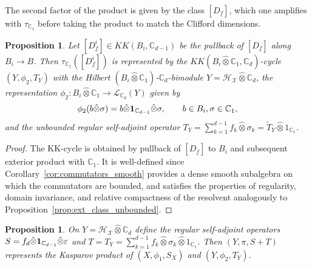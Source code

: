 \documentclass[12pt]{amsart}
\newtheorem{proposition}[theorem]{Proposition}
\newcommand{\CM}{{\mathbb C}}
\newcommand{\Ll}{{\mathcal L}}
\newcommand{\Hh}{{\mathcal H}}
\newcommand{\Xx}{{\mathcal X}}
\newcommand{\one}{{\bf 1}}
\newcommand{\ep}{\varepsilon}
\begin{document}
The second factor of the product is given by the class $[D_{\underline{f}}]$, which one amplifies with $\tau_{\CM_1}$ before taking the product to match the Clifford dimensions. 
\begin{proposition}
Let $[D_{\underline{f}}^i]\in KK(B_i, \CM_{d-1})$ be the pullback of $[D_{\underline{f}}]$ along $B_i\to B$. Then $\tau_{\CM_1}([D^i_{\underline{f}}])$ is represented by the $KK(B_i\hat{\otimes}\CM_1, \CM_d)$-cycle $(Y, \phi_2, T_Y)$ with  the Hilbert $(B_i\hat{\otimes}\CM_1)$-$\CM_d$-bimodule $Y= \Hh_\Xx \hat{\otimes} \CM_{d}$, the representation $\phi_2 \colon B_i \hat{\otimes} \CM_1 \to \Ll_{\CM_d}(Y)$ given by
    $$\phi_2(b\hat{\otimes} \sigma) = b \hat{\otimes}  \one_{\CM_{d-1}} \hat{\otimes} \sigma, \qquad b\in B_i, \sigma\in \CM_1,$$
and the unbounded regular self-adjoint operator $T_Y  = \sum_{k=1}^{d-1} {f_k} \hat{\otimes} \sigma_k= \tilde{T}_Y\hat{\otimes} 1_{\CM_1}$. 
\end{proposition}
\begin{proof}
The KK-cycle is obtained by pullback of $[D_{\underline{f}}]$ to $B_i$ and subsequent exterior product with $\CM_1$. It is well-defined since Corollary~\ref{cor:commutators_smooth} provides a dense smooth subalgebra on which the commutators are bounded, and satisfies the properties of regularity, domain invariance, and relative compactness of the resolvent analogously to Proposition~\ref{prop:ext_class_unbounded}.
\end{proof}



\begin{proposition}\label{prop:kasparov_sum}
On $Y=\Hh_\Xx\hat{\otimes}\CM_d$ define the regular self-adjoint operators $S = {f_d} \hat{\otimes} \one_{\CM_{d-1}}\hat{\otimes} \ep$ and $T = T_Y = \sum_{k=1}^{d-1} {f_k} \hat{\otimes} \sigma_k \hat{\otimes} 1_{\CM_1}$. Then $(Y, \pi, S+T)$ represents the Kasparov product of $(X, \phi_1, S_X)$ and $(Y, \phi_2, T_Y)$.
\end{proposition}
\end{document}
